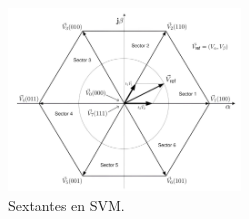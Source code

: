 \documentclass[11pt]{report}
\begin{document}


\begin{figure}[ht]
	\centering
	\includegraphics[width=0.55\textwidth]{imagenes/Diagramas/sectantes.png}
	\caption{Sextantes en SVM.}
	\label{fig:sectantes}
\end{figure}
\FloatBarrier


\end{document}
